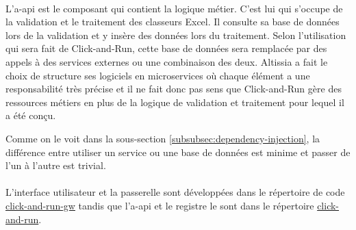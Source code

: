 \paragraph{}
L'\gls{a-api} est le composant qui contient la logique métier.
C'est lui qui s'occupe de la validation et le traitement des classeurs Excel.
Il consulte sa base de données lors de la validation et y insère des données lors du traitement.
Selon l'utilisation qui sera fait de Click-and-Run, cette base de données sera remplacée par des appels à des services externes ou une combinaison des deux.
Altissia a fait le choix de structure ses logiciels en microservices où chaque élément a une responsabilité très précise et il ne fait donc pas sens que Click-and-Run gère des ressources métiers en plus de la logique de validation et traitement pour lequel il a été conçu.

Comme on le voit dans la sous-section \ref{subsubsec:dependency-injection}, la différence entre utiliser un service ou une base de données est minime et passer de l'un à l'autre est trivial.

\paragraph{}
L'interface utilisateur et la passerelle sont développées dans le répertoire de code \href{https://github.com/click-and-run/click-and-run-gw}{click-and-run-gw}\fnmark{} tandis que l'\gls{a-api} et le registre le sont dans le répertoire \href{https://github.com/click-and-run/click-and-run}{click-and-run}\fnmark{}.



